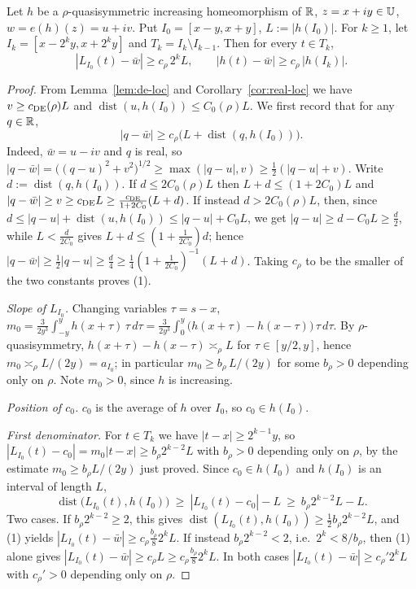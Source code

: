 \begin{lemma}\label{lem:denom}
	\leanok
	Let $h$ be a $\rho$-quasisymmetric increasing homeomorphism of $\mathbb{R}$, $z=x+iy\in\mathbb{U}$, $w=e(h)(z)=u+iv$. Put $I_0=[x-y,x+y]$, $L:=|h(I_0)|$. For $k\ge1$, let $I_k=[x-2^ky,x+2^ky]$ and $T_k=I_k\setminus I_{k-1}$. Then for every $t\in T_k$,
	\[
	|L_{I_0}(t)-\bar w|\ge c_\rho\,2^k L,\qquad
	|h(t)-\bar w|\ge c_\rho\,|h(I_k)|.
	\]
\end{lemma}

\begin{proof}
	From Lemma~\ref{lem:de-loc} and Corollary~\ref{cor:real-loc} we have
	$v\ge c_{\rm DE}(\rho)L$ and $\operatorname{dist}(u,h(I_0))\le C_0(\rho)L$. We
	first
	record that for any $q\in\mathbb{R}$,
	\[
	|q-\bar w|\ge c_\rho\bigl(L+\operatorname{dist}(q,h(I_0))\bigr).
	\tag{1}
	\]
	Indeed, $\bar w=u-iv$ and $q$ is real, so
	$|q-\bar w|=\bigl((q-u)^2+v^2\bigr)^{1/2}\ge\max(|q-u|,v)\ge\frac12(|q-u|+v)$.
	Write $d:=\operatorname{dist}(q,h(I_0))$. If $d\le2C_0(\rho)L$ then
	$L+d\le(1+2C_0)L$ and
	$|q-\bar w|\ge v\ge c_{\rm DE}L\ge\frac{c_{\rm DE}}{1+2C_0}(L+d)$. If
	instead $d>2C_0(\rho)L$, then, since
	$d\le|q-u|+\operatorname{dist}(u,h(I_0))\le|q-u|+C_0L$, we get
	$|q-u|\ge d-C_0L\ge\frac d2$, while $L<\frac{d}{2C_0}$ gives
	$L+d\le(1+\frac1{2C_0})d$; hence
	$|q-\bar w|\ge\frac12|q-u|\ge\frac d4\ge\frac{1}{4}(1+\frac1{2C_0})^{-1}(L+d)$.
	Taking $c_\rho$ to be the smaller of the two constants proves (1).
	
	\medskip\noindent\textit{Slope of $L_{I_0}$.}
	Changing variables $\tau=s-x$,
	$m_0=\frac{3}{2y^3}\int_{-y}^{y}h(x+\tau)\,\tau\,d\tau
	=\frac{3}{2y^3}\int_0^{y}\bigl(h(x+\tau)-h(x-\tau)\bigr)\,\tau\,d\tau$.
	By $\rho$-quasisymmetry, $h(x+\tau)-h(x-\tau)\asymp_\rho L$ for $\tau\in[y/2,y]$, hence $m_0\asymp_\rho L/(2y)=a_{I_0}$; in particular $m_0\ge b_\rho\,L/(2y)$ for some $b_\rho>0$ depending only on $\rho$. Note $m_0>0$, since $h$ is increasing.
	
	\medskip\noindent\textit{Position of $c_0$.}
	$c_0$ is the average of $h$ over $I_0$, so $c_0\in h(I_0)$.
	
	\medskip\noindent\textit{First denominator.}
	For $t\in T_k$ we have $|t-x|\ge2^{k-1}y$, so
	$|L_{I_0}(t)-c_0|=m_0|t-x|\ge b_\rho2^{k-2}L$ with $b_\rho>0$ depending only on
	$\rho$, by the estimate $m_0\ge b_\rho L/(2y)$ just proved. Since $c_0\in h(I_0)$
	and $h(I_0)$ is an interval of length $L$,
	\[
	\operatorname{dist}\bigl(L_{I_0}(t),h(I_0)\bigr)\ \ge\ |L_{I_0}(t)-c_0|-L
	\ \ge\ b_\rho2^{k-2}L-L .
	\]
	Two cases. If $b_\rho2^{k-2}\ge2$, this gives
	$\operatorname{dist}(L_{I_0}(t),h(I_0))\ge\frac12b_\rho2^{k-2}L$, and (1) yields
	$|L_{I_0}(t)-\bar w|\ge c_\rho\frac{b_\rho}{8}2^{k}L$. If instead
	$b_\rho2^{k-2}<2$, i.e.\ $2^k<8/b_\rho$, then (1) alone gives
	$|L_{I_0}(t)-\bar w|\ge c_\rho L\ge c_\rho\frac{b_\rho}{8}2^kL$. In both cases
	$|L_{I_0}(t)-\bar w|\ge c_\rho' 2^kL$ with $c_\rho'>0$ depending only on $\rho$.
	

\end{proof}

